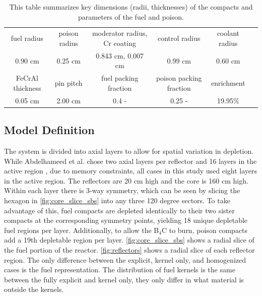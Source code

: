 \documentclass[letterpaper]{physor2024}
\begin{document}
\vspace*{-0.5cm}
\begin{table}[h]
    \centering
    \caption{This table summarizes key dimensions (radii, thicknesses) of the compacts and parameters of the fuel and poison.}
    \begin{tabular}{|c|c|c|c|c|c|}
    \hline
    fuel radius & poison radius & moderator radius, Cr coating & control radius & coolant radius \\
    0.90 cm & 0.25 cm   & 0.843 cm, 0.007 cm & 0.99 cm    & 0.60 cm  \\
    \hline
    FeCrAl thickness & pin pitch & fuel packing fraction & poison packing fraction & enrichment \\
    0.05 cm & 2.00 cm  & 0.4 -  & 0.25 - & 19.95\% \\
    \hline
    \end{tabular}
    \vspace{-0.5cm}
    \label{tab:dimensions}
\end{table}

\subsection{Model Definition}\label{sec:model_def}
The system is divided into axial layers to allow for spatial variation in depletion. While Abdelhameed et al. chose two axial layers per reflector and 16 layers in the active region \cite{Abdelhameed-ANS-2022}, due to memory constraints, all cases in this study used eight layers in the active region. The reflectors are 20 cm high and the core is 160 cm high. Within each layer there is 3-way symmetry, which can be seen by slicing the hexagon in \cref{fig:core_slice_sbs} into any three 120 degree sectors. To take advantage of this, fuel compacts are depleted identically to their two sister compacts at the corresponding symmetry points, yielding 18 unique depletable fuel regions per layer. Additionally, to allow the B$_{4}$C to burn, poison compacts add a 19th depletable region per layer. \cref{fig:core_slice_sbs} shows a radial slice of the fuel portion of the reactor. \cref{fig:reflectors} shows a radial slice of each reflector region. The only difference between the explicit, kernel only, and homogenized cases is the fuel representation. The distribution of fuel kernels is the same between the fully explicit and kernel only, they only differ in what material is outside the kernels.
\end{document}
